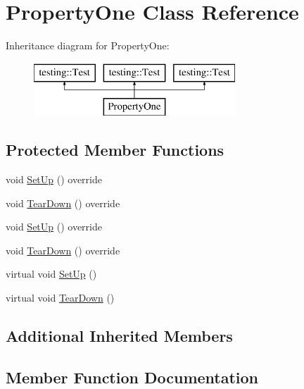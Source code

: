 \hypertarget{class_property_one}{}\section{Property\+One Class Reference}
\label{class_property_one}
Inheritance diagram for Property\+One\+:\begin{figure}[H]
\begin{center}
\leavevmode
\includegraphics[height=2.000000cm]{d0/db5/class_property_one}
\end{center}
\end{figure}
\subsection*{Protected Member Functions}
\begin{DoxyCompactItemize}
\item 
void \mbox{\hyperlink{class_property_one_a0a31b0c199b14438b9cfbd27645aa542}{Set\+Up}} () override
\item 
void \mbox{\hyperlink{class_property_one_a0a9a054682c28e32d6b3007e966a1aaf}{Tear\+Down}} () override
\item 
void \mbox{\hyperlink{class_property_one_a0a31b0c199b14438b9cfbd27645aa542}{Set\+Up}} () override
\item 
void \mbox{\hyperlink{class_property_one_a0a9a054682c28e32d6b3007e966a1aaf}{Tear\+Down}} () override
\item 
virtual void \mbox{\hyperlink{class_property_one_a9cb7d7cb508d5f1a6fc7cfead81ebc2b}{Set\+Up}} ()
\item 
virtual void \mbox{\hyperlink{class_property_one_a3ed895113848403d5ea27f52a1bb0545}{Tear\+Down}} ()
\end{DoxyCompactItemize}
\subsection*{Additional Inherited Members}


\subsection{Member Function Documentation}
\mbox{\label{class_property_one_a0a31b0c199b14438b9cfbd27645aa542}} 
